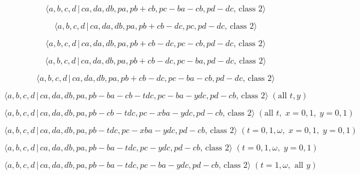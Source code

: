 \documentclass[10pt]{article}
\begin{document}
\begin{equation}
\langle a,b,c,d\,|\,ca,da,db,pa,pb+cb,pc-ba-cb,pd-dc,\,\text{class }2\rangle
\tag{7.3119}
\end{equation}

\begin{equation}
\langle a,b,c,d\,|\,ca,da,db,pa,pb+cb-dc,pc,pd-dc,\,\text{class }2\rangle 
\tag{7.3120}
\end{equation}

\begin{equation}
\langle a,b,c,d\,|\,ca,da,db,pa,pb+cb-dc,pc-cb,pd-dc,\,\text{class }2\rangle
\tag{7.3121}
\end{equation}

\begin{equation}
\langle a,b,c,d\,|\,ca,da,db,pa,pb+cb-dc,pc-ba,pd-dc,\,\text{class }2\rangle
\tag{7.3122}
\end{equation}

\begin{equation}
\langle a,b,c,d\,|\,ca,da,db,pa,pb+cb-dc,pc-ba-cb,pd-dc,\,\text{class }%
2\rangle  \tag{7.3123}
\end{equation}

\begin{equation}
\langle a,b,c,d\,|\,ca,da,db,pa,pb-ba-cb-tdc,pc-ba-ydc,pd-cb,\,\text{class }%
2\rangle \;(\text{all }t,y)  \tag{7.3124}
\end{equation}

\begin{equation}
\langle a,b,c,d\,|\,ca,da,db,pa,pb-cb-tdc,pc-xba-ydc,pd-cb,\,\text{class }%
2\rangle \;(\text{all }t,\;x=0,1,\;y=0,1)  \tag{7.3125}
\end{equation}

\begin{equation}
\langle a,b,c,d\,|\,ca,da,db,pa,pb-tdc,pc-xba-ydc,pd-cb,\,\text{class }%
2\rangle \;(t=0,1,\omega ,\;x=0,1,\;y=0,1)  \tag{7.3126}
\end{equation}

\begin{equation}
\langle a,b,c,d\,|\,ca,da,db,pa,pb-ba-tdc,pc-ydc,pd-cb,\,\text{class }%
2\rangle \;(t=0,1,\omega ,\;y=0,1)  \tag{7.3127}
\end{equation}

\begin{equation}
\langle a,b,c,d\,|\,ca,da,db,pa,pb-ba-tdc,pc-ba-ydc,pd-cb,\,\text{class }%
2\rangle \;(t=1,\omega ,\text{ all }y)  \tag{7.3128}
\end{equation}
\end{document}
